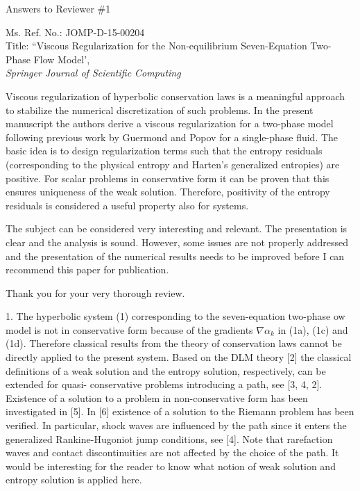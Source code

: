 \documentclass{article}
\newcommand{\tcr}[1]{\textcolor{red}{#1}}
\begin{document}
\begin{center}
{ \Large Answers to Reviewer \#1}
\end{center}

\bigskip

\noindent Ms. Ref. No.: JOMP-D-15-00204\\
Title: ``Viscous Regularization for the Non-equilibrium Seven-Equation Two-Phase Flow Model', \\
{\it Springer Journal of Scientific Computing}\\

\bigskip


%
\bigskip

{\color{blue}
Viscous regularization of hyperbolic conservation laws is a meaningful approach to stabilize
the numerical discretization of such problems. In the present manuscript the authors derive
a viscous regularization for a two-phase model following previous work by Guermond and
Popov for a single-phase fluid. The basic idea is to design regularization terms such that
the entropy residuals (corresponding to the physical entropy and Harten's generalized
entropies) are positive. For scalar problems in conservative form it can be proven that this
ensures uniqueness of the weak solution. Therefore, positivity of the entropy residuals is
considered a useful property also for systems.

The subject can be considered very interesting and relevant. The presentation is clear
and the analysis is sound. However, some issues are not properly addressed and the
presentation of the numerical results needs to be improved before I can recommend this
paper for publication.}

Thank you for your very thorough review. 
\bigskip


{\color{blue}
1. The hyperbolic system (1) corresponding to the seven-equation two-phase ow model
is not in conservative form because of the gradients $\nabla \alpha_k$ in (1a), (1c) and (1d).
Therefore classical results from the theory of conservation laws cannot be directly
applied to the present system. Based on the DLM theory [2] the classical definitions
of a weak solution and the entropy solution, respectively, can be extended for quasi-
conservative problems introducing a path, see [3, 4, 2]. Existence of a solution to
a problem in non-conservative form has been investigated in [5]. In [6] existence of
a solution to the Riemann problem has been verified. In particular, shock waves
are influenced by the path since it enters the generalized Rankine-Hugoniot jump
conditions, see [4]. Note that rarefaction waves and contact discontinuities are not
affected by the choice of the path. It would be interesting for the reader to know
what notion of weak solution and entropy solution is applied here.}
\end{document}
